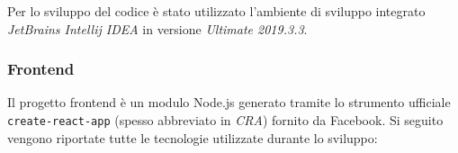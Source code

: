       Per lo sviluppo del codice è stato utilizzato l'ambiente di sviluppo integrato \emph{JetBrains Intellij IDEA} in versione \emph{Ultimate 2019.3.3}.

    \subsubsection{Frontend}

      Il progetto frontend è un modulo Node.js generato tramite lo strumento ufficiale \texttt{create-react-app} (spesso abbreviato in \emph{CRA}) fornito da Facebook.
      Si seguito vengono riportate tutte le tecnologie utilizzate durante lo sviluppo:

